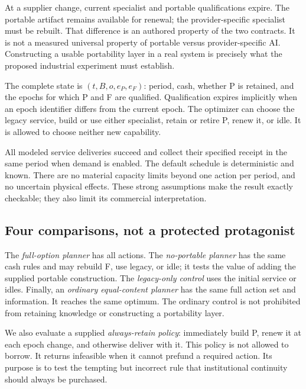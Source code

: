 At a supplier change, current specialist and portable qualifications expire. The portable artifact remains available for renewal; the provider-specific specialist must be rebuilt. That difference is an authored property of the two contracts. It is not a measured universal property of portable versus provider-specific AI. Constructing a usable portability layer in a real system is precisely what the proposed industrial experiment must establish.

The complete state is $(t,B,o,e_P,e_F)$: period, cash, whether P is retained, and the epochs for which P and F are qualified. Qualification expires implicitly when an epoch identifier differs from the current epoch. The optimizer can choose the legacy service, build or use either specialist, retain or retire P, renew it, or idle. It is allowed to choose neither new capability.

All modeled service deliveries succeed and collect their specified receipt in the same period when demand is enabled. The default schedule is deterministic and known. There are no material capacity limits beyond one action per period, and no uncertain physical effects. These strong assumptions make the result exactly checkable; they also limit its commercial interpretation.

\subsection{Four comparisons, not a protected protagonist}
The \emph{full-option planner} has all actions. The \emph{no-portable planner} has the same cash rules and may rebuild F, use legacy, or idle; it tests the value of adding the supplied portable construction. The \emph{legacy-only control} uses the initial service or idles. Finally, an \emph{ordinary equal-content planner} has the same full action set and information. It reaches the same optimum. The ordinary control is not prohibited from retaining knowledge or constructing a portability layer.

We also evaluate a supplied \emph{always-retain policy}: immediately build P, renew it at each epoch change, and otherwise deliver with it. This policy is not allowed to borrow. It returns infeasible when it cannot prefund a required action. Its purpose is to test the tempting but incorrect rule that institutional continuity should always be purchased.

